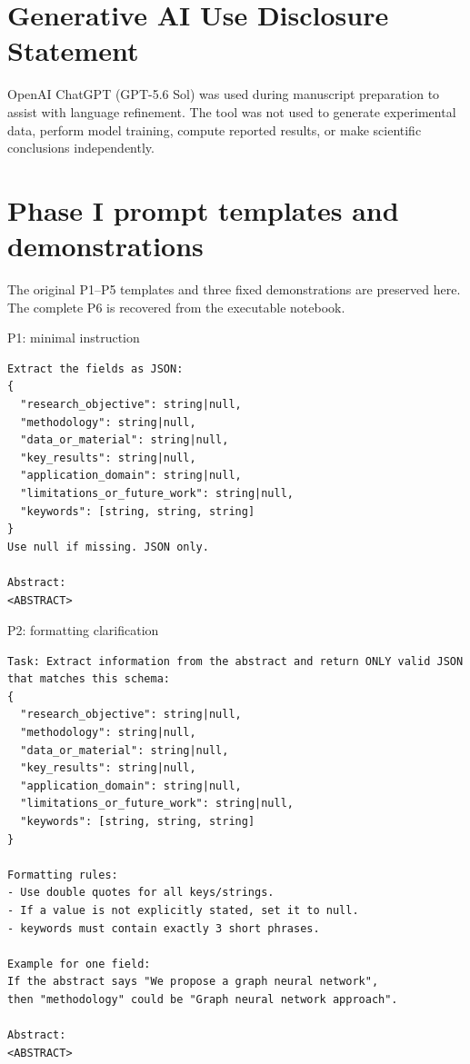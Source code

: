 \documentclass[fleqn,10pt]{wlscirep-authoryear}
\begin{document}
\section*{Generative AI Use Disclosure Statement}

OpenAI ChatGPT (GPT-5.6 Sol) was used during manuscript preparation to assist
with language refinement. The tool was not used
to generate experimental data, perform model training, compute reported
results, or make scientific conclusions independently.



\appendix

\section{Phase I prompt templates and demonstrations}
\label{app:phase1-prompts}
The original P1--P5 templates and three fixed demonstrations are
preserved here. The complete P6 is recovered from the executable notebook.

\begin{promptbox}{P1: minimal instruction}
\begin{lstlisting}[style=promptstyle]
Extract the fields as JSON:
{
  "research_objective": string|null,
  "methodology": string|null,
  "data_or_material": string|null,
  "key_results": string|null,
  "application_domain": string|null,
  "limitations_or_future_work": string|null,
  "keywords": [string, string, string]
}
Use null if missing. JSON only.

Abstract:
<ABSTRACT>
\end{lstlisting}
\end{promptbox}

\begin{promptbox}{P2: formatting clarification}
\begin{lstlisting}[style=promptstyle]
Task: Extract information from the abstract and return ONLY valid JSON that matches this schema:
{
  "research_objective": string|null,
  "methodology": string|null,
  "data_or_material": string|null,
  "key_results": string|null,
  "application_domain": string|null,
  "limitations_or_future_work": string|null,
  "keywords": [string, string, string]
}

Formatting rules:
- Use double quotes for all keys/strings.
- If a value is not explicitly stated, set it to null.
- keywords must contain exactly 3 short phrases.

Example for one field:
If the abstract says "We propose a graph neural network",
then "methodology" could be "Graph neural network approach".

Abstract:
<ABSTRACT>
\end{lstlisting}
\end{promptbox}
\end{document}
